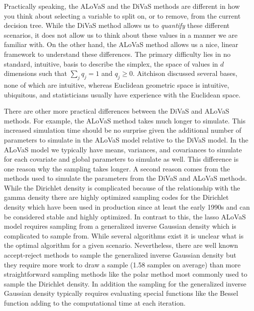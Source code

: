 Practically speaking, the ALoVaS and the DiVaS methods are different in how you think about selecting a variable to split on, or to remove, from the current decision tree. While the DiVaS method allows us to \emph{quantify} these different scenarios, it does not allow us to think about these values in a manner we are familiar with. On the other hand, the ALoVaS method allows us a nice, linear framework to understand these differences. The primary difficulty lies in no standard, intuitive, basis to describe the simplex, the space of values in $d$ dimensions such that $\sum_jq_j=1$ and $q_j \geq 0$. Aitchison \cite{aitchison1986statistical} discussed several bases, none of which are intuitive, whereas Euclidean geometric space is intuitive, ubiquitous, and statisticians usually have experience with the Euclidean space.   

There are other more practical differences between the DiVaS and ALoVaS methods. For example, the ALoVaS method takes much longer to simulate. This increased simulation time should be no surprise given the additional number of parameters to simulate in the ALoVaS model relative to the DiVaS model. In the ALoVaS model we typically have means, variances, and covariances to simulate for each covariate and global parameters to simulate as well. This difference is one reason why the sampling takes longer. A second reason comes from the methods used to simulate the parameters from the DiVaS and ALoVaS methods. While the Dirichlet density is complicated because of the relationship with the gamma density there are highly optimized sampling codes for the Dirichlet density which have been used in production since at least the early 1990s and can be considered stable and highly optimized. In contrast to this, the lasso ALoVaS model requires sampling from a generalized inverse Gaussian density which is complicated to sample from. While several algorithms exist it is unclear what is the optimal algorithm for a given scenario. Nevertheless, there are well known accept-reject methods to sample the generalized inverse Gaussian density but they require more work to draw a sample (1.58 samples on average)  than more straightforward sampling methods like the polar method most commonly used to sample the Dirichlet density. In addition the sampling for the generalized inverse Gaussian density typically requires evaluating special functions like the Bessel function adding to the computational time at each iteration. 

